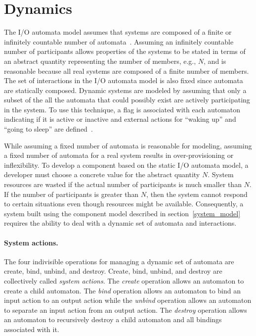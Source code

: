 \section{Dynamics\label{dynamics}}

The I/O automata model assumes that systems are composed of a finite or infinitely countable number of automata~\cite{lynch1996distributed}.
Assuming an infinitely countable number of participants allows properties of the systems to be stated in terms of an abstract quantity representing the number of members, e.g., $N$, and is reasonable because all real systems are composed of a finite number of members.
The set of interactions in the I/O automata model is also fixed since automata are statically composed.
Dynamic systems are modeled by assuming that only a subset of the all the automata that could possibly exist are actively participating in the system.
To use this technique, a flag is associated with each automaton indicating if it is active or inactive and external actions for ``waking up'' and ``going to sleep'' are defined~\cite{lynch1996distributed}.

While assuming a fixed number of automata is reasonable for modeling, assuming a fixed number of automata for a real system results in over-provisioning or inflexibility.
To develop a component based on the static I/O automata model, a developer must choose a concrete value for the abstract quantity $N$.
System resources are wasted if the actual number of participants is much smaller than $N$.
If the number of participants is greater than $N$, then the system cannot respond to certain situations even though resources might be available.
Consequently, a system built using the component model described in section~\ref{system_model} requires the ability to deal with a dynamic set of automata and interactions.

\paragraph{System actions.}
The four indivisible operations for managing a dynamic set of automata are create, bind, unbind, and destroy.
Create, bind, unbind, and destroy are collectively called \emph{system actions}.
The \emph{create} operation allows an automaton to create a child automaton.
The \emph{bind} operation allows an automaton to bind an input action to an output action while the \emph{unbind} operation allows an automaton to separate an input action from an output action.
The \emph{destroy} operation allows an automaton to recursively destroy a child automaton and all bindings associated with it.

